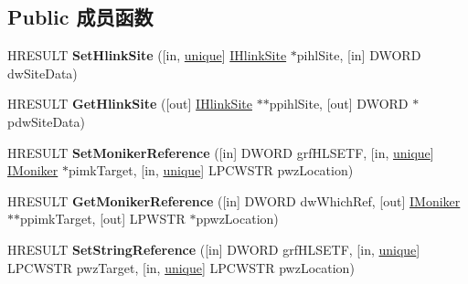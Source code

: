 \subsection*{Public 成员函数}
\begin{DoxyCompactItemize}
\item 
\mbox{\label{interface_i_hlink_a914c6b3f3c6b642e489e217df1cfc801}} 
H\+R\+E\+S\+U\+LT {\bfseries Set\+Hlink\+Site} (\mbox{[}in, \hyperlink{interfaceunique}{unique}\mbox{]} \hyperlink{interface_i_hlink_site}{I\+Hlink\+Site} $\ast$pihl\+Site, \mbox{[}in\mbox{]} D\+W\+O\+RD dw\+Site\+Data)
\item 
\mbox{\label{interface_i_hlink_aa7f10347343dc3008d9e354f3bab1187}} 
H\+R\+E\+S\+U\+LT {\bfseries Get\+Hlink\+Site} (\mbox{[}out\mbox{]} \hyperlink{interface_i_hlink_site}{I\+Hlink\+Site} $\ast$$\ast$ppihl\+Site, \mbox{[}out\mbox{]} D\+W\+O\+RD $\ast$pdw\+Site\+Data)
\item 
\mbox{\label{interface_i_hlink_ab76f0dc23f2e064310ee17a0c48125f4}} 
H\+R\+E\+S\+U\+LT {\bfseries Set\+Moniker\+Reference} (\mbox{[}in\mbox{]} D\+W\+O\+RD grf\+H\+L\+S\+E\+TF, \mbox{[}in, \hyperlink{interfaceunique}{unique}\mbox{]} \hyperlink{interface_i_moniker}{I\+Moniker} $\ast$pimk\+Target, \mbox{[}in, \hyperlink{interfaceunique}{unique}\mbox{]} L\+P\+C\+W\+S\+TR pwz\+Location)
\item 
\mbox{\label{interface_i_hlink_a75be31b9aee4471258b9412e25e718f1}} 
H\+R\+E\+S\+U\+LT {\bfseries Get\+Moniker\+Reference} (\mbox{[}in\mbox{]} D\+W\+O\+RD dw\+Which\+Ref, \mbox{[}out\mbox{]} \hyperlink{interface_i_moniker}{I\+Moniker} $\ast$$\ast$ppimk\+Target, \mbox{[}out\mbox{]} L\+P\+W\+S\+TR $\ast$ppwz\+Location)
\item 
\mbox{\label{interface_i_hlink_a464d8d5b960f5b9a2a536698d8ace01d}} 
H\+R\+E\+S\+U\+LT {\bfseries Set\+String\+Reference} (\mbox{[}in\mbox{]} D\+W\+O\+RD grf\+H\+L\+S\+E\+TF, \mbox{[}in, \hyperlink{interfaceunique}{unique}\mbox{]} L\+P\+C\+W\+S\+TR pwz\+Target, \mbox{[}in, \hyperlink{interfaceunique}{unique}\mbox{]} L\+P\+C\+W\+S\+TR pwz\+Location)
\item 
\mbox{\label{interface_i_hlink_acb8bda961413390a88977bd55065a2fb}} 

\end{DoxyCompactItemize}
